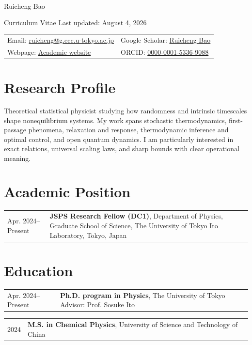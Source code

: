 \documentclass[10pt,a4paper]{article}
\makeatletter
\newcommand{\entry}[2]{%
  \begin{tabularx}{\textwidth}{@{}p{0.19\textwidth}X@{}}
    \color{muted}#1 & #2
  \end{tabularx}\par
}
\makeatother
\begin{document}
\begin{center}
  {\fontsize{27}{31}\selectfont Ruicheng Bao}\par
  \vspace{0.25em}
  {\small\color{muted}Curriculum Vitae \enspace\textbar\enspace Last updated: August 4, 2026}
\end{center}

\vspace{0.65em}
\begin{tabularx}{\textwidth}{@{}X X@{}}
  Email: \href{mailto:ruicheng@g.ecc.u-tokyo.ac.jp}{ruicheng@g.ecc.u-tokyo.ac.jp} &
  Google Scholar: \href{https://scholar.google.com/citations?user=ZSFCDtUAAAAJ}{Ruicheng Bao} \\
  Webpage: \href{https://ruicheng-12.github.io/}{Academic website} &
  ORCID: \href{https://orcid.org/0000-0001-5336-9088}{0000-0001-5336-9088}
\end{tabularx}

\section{Research Profile}

Theoretical statistical physicist studying how randomness and intrinsic timescales shape nonequilibrium systems. My work spans stochastic thermodynamics, first-passage phenomena, relaxation and response, thermodynamic inference and optimal control, and open quantum dynamics. I am particularly interested in exact relations, universal scaling laws, and sharp bounds with clear operational meaning.

\section{Academic Position}

\entry{Apr. 2024--Present}{\textbf{JSPS Research Fellow (DC1)}, Department of Physics, Graduate School of Science, The University of Tokyo\newline
Ito Laboratory, Tokyo, Japan}

\section{Education}

\entry{Apr. 2024--Present}{\textbf{Ph.D. program in Physics}, The University of Tokyo\newline
Advisor: Prof. Sosuke Ito}

\entry{2024}{\textbf{M.S. in Chemical Physics}, University of Science and Technology of China}
\end{document}
